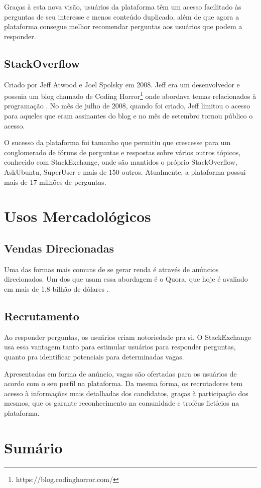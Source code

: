 Graças à esta nova visão, usuários da plataforma têm um acesso facilitado às perguntas de seu interesse e menos conteúdo duplicado, além de que agora a plataforma consegue melhor recomendar perguntas aos usuários que podem a responder.
\subsection{StackOverflow}
Criado por Jeff Atwood e Joel Spolsky em 2008. Jeff era um desenvolvedor e possuia um blog chamado de Coding Horror\footnote{https://blog.codinghorror.com/} onde abordava temas relacionados à programação \cite{codinghorror}. No mês de julho de 2008, quando foi criado, Jeff limitou o acesso para aqueles que eram assinantes do blog e no mês de setembro tornou público o acesso.

O sucesso da plataforma foi tamanho que permitiu que crescesse para um conglomerado de fóruns de perguntas e respostas sobre vários outros tópicos, conhecido com StackExchange, onde são mantidos o próprio StackOverflow, AskUbuntu, SuperUser e mais de 150 outros. Atualmente, a plataforma possui mais de 17 milhões de perguntas.

\section{Usos Mercadológicos}

\subsection{Vendas Direcionadas}
Uma das formas mais comuns de se gerar renda é através de anúncios direcionados. Um dos que usam essa abordagem é o Quora, que hoje é avaliado em mais de 1,8 bilhão de dólares \cite{quorarevenuemodel}.

\subsection{Recrutamento}
Ao responder perguntas, os usuários criam notoriedade pra si. O StackExchange usa essa vantagem tanto para estimular usuários para responder perguntas, quanto pra identificar potenciais para determinadas vagas.

Apresentadas em forma de anúncio, vagas são ofertadas para os usuários de acordo com o seu perfil na plataforma. Da mesma forma, os recrutadores tem acesso à informações mais detalhadas dos candidatos, graças à participação dos mesmos, que os garante reconhecimento na comunidade e troféus fictícios na plataforma.

\section{Sumário}